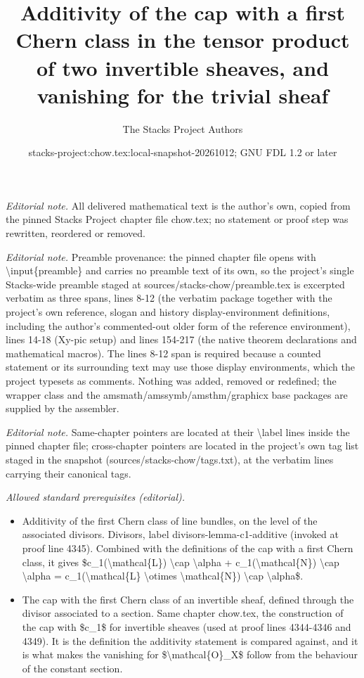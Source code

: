 \documentclass[10pt,a4paper]{amsart}
\title{Additivity of the cap with a first Chern class in the tensor product of two invertible sheaves, and vanishing for the trivial sheaf}
\author{The Stacks Project Authors}
\date{stacks-project:chow.tex:local-snapshot-20261012; GNU FDL 1.2 or later}
\theoremstyle{plain}
\theoremstyle{definition}
\theoremstyle{remark}
\numberwithin{equation}{subsection}
\begin{document}
\maketitle
\noindent\textit{Editorial note.} All delivered mathematical text is the author's own, copied from the pinned Stacks Project chapter file chow.tex; no statement or proof step was rewritten, reordered or removed.\par\medskip
\noindent\textit{Editorial note.} Preamble provenance: the pinned chapter file opens with \textbackslash{}input\{preamble\} and carries no preamble text of its own, so the project's single Stacks-wide preamble staged at sources/stacks-chow/preamble.tex is excerpted verbatim as three spans, lines 8-12 (the verbatim package together with the project's own reference, slogan and history display-environment definitions, including the author's commented-out older form of the reference environment), lines 14-18 (Xy-pic setup) and lines 154-217 (the native theorem declarations and mathematical macros). The lines 8-12 span is required because a counted statement or its surrounding text may use those display environments, which the project typesets as comments. Nothing was added, removed or redefined; the wrapper class and the amsmath/amssymb/amsthm/graphicx base packages are supplied by the assembler.\par\medskip
\noindent\textit{Editorial note.} Same-chapter pointers are located at their \textbackslash{}label lines inside the pinned chapter file; cross-chapter pointers are located in the project's own tag list staged in the snapshot (sources/stacks-chow/tags.txt), at the verbatim lines carrying their canonical tags.\par\medskip
\noindent\textit{Allowed standard prerequisites (editorial).}\begin{itemize}
\item Additivity of the first Chern class of line bundles, on the level of the associated divisors. Divisors, label divisors-lemma-c1-additive (invoked at proof line 4345). Combined with the definitions of the cap with a first Chern class, it gives \$c\_1(\textbackslash{}mathcal\{L\}) \textbackslash{}cap \textbackslash{}alpha + c\_1(\textbackslash{}mathcal\{N\}) \textbackslash{}cap \textbackslash{}alpha = c\_1(\textbackslash{}mathcal\{L\} \textbackslash{}otimes \textbackslash{}mathcal\{N\}) \textbackslash{}cap \textbackslash{}alpha\$.
\item The cap with the first Chern class of an invertible sheaf, defined through the divisor associated to a section. Same chapter chow.tex, the construction of the cap with \$c\_1\$ for invertible sheaves (used at proof lines 4344-4346 and 4349). It is the definition the additivity statement is compared against, and it is what makes the vanishing for \$\textbackslash{}mathcal\{O\}\_X\$ follow from the behaviour of the constant section.
\end{itemize}\medskip
\end{document}
